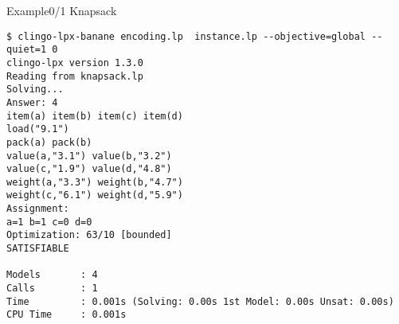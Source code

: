 \begin{frame}[fragile]{Example}{0/1 Knapsack}
\begin{adjustbox}{max totalsize={\textwidth}{.75\textheight},keepaspectratio}
\begin{lstlisting}
$ clingo-lpx-banane encoding.lp  instance.lp --objective=global --quiet=1 0
clingo-lpx version 1.3.0
Reading from knapsack.lp
Solving...
Answer: 4
item(a) item(b) item(c) item(d)
load("9.1")
pack(a) pack(b)
value(a,"3.1") value(b,"3.2")
value(c,"1.9") value(d,"4.8")
weight(a,"3.3") weight(b,"4.7")
weight(c,"6.1") weight(d,"5.9")
Assignment:
a=1 b=1 c=0 d=0
Optimization: 63/10 [bounded]
SATISFIABLE

Models       : 4
Calls        : 1
Time         : 0.001s (Solving: 0.00s 1st Model: 0.00s Unsat: 0.00s)
CPU Time     : 0.001s
\end{lstlisting}
\end{adjustbox}
\end{frame}
%
